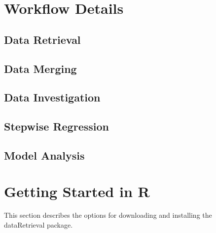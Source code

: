 \documentclass[a4paper,11pt]{article}\usepackage[]{graphicx}\usepackage[]{color}
\begin{document}
\section{Workflow Details}
\label{sec:details}

\subsection{Data Retrieval}

\subsection{Data Merging}

\subsection{Data Investigation}

\subsection{Stepwise Regression}

\subsection{Model Analysis}

\clearpage
\appendix

\section{Getting Started in R}
\label{sec:appendix1}
This section describes the options for downloading and installing the dataRetrieval package.
\end{document}
